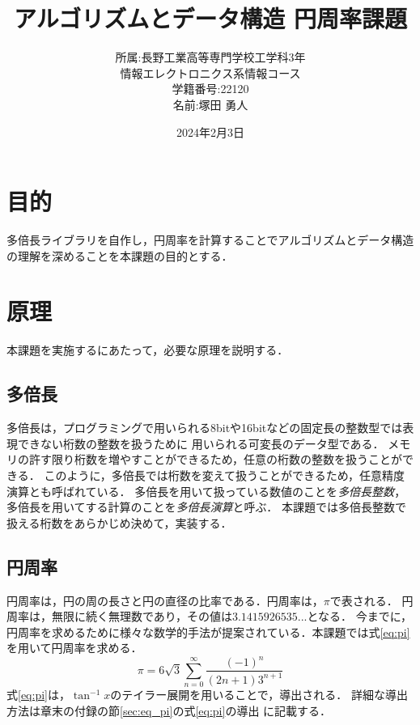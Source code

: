 \documentclass[a4paper,11pt,dvipdfmx]{jsarticle}
\begin{document}
\setcounter{tocdepth}{3} %
\title{アルゴリズムとデータ構造 円周率課題}
\author{所属:長野工業高等専門学校工学科3年\\情報エレクトロニクス系情報コース \\学籍番号:22120 \\名前:塚田 勇人}
\date{2024年2月3日}
\maketitle
\thispagestyle{empty} %
\newpage

\section{目的}
多倍長ライブラリを自作し，円周率を計算することでアルゴリズムとデータ構造の理解を深めることを本課題の目的とする．

\section{原理}
\label{sec:principle}
本課題を実施するにあたって，必要な原理を説明する．

\subsection{多倍長}
多倍長は，プログラミングで用いられる8bitや16bitなどの固定長の整数型では表現できない桁数の整数を扱うために
用いられる可変長のデータ型である．
メモリの許す限り桁数を増やすことができるため，任意の桁数の整数を扱うことができる．
このように，多倍長では桁数を変えて扱うことができるため，任意精度演算とも呼ばれている．
多倍長を用いて扱っている数値のことを\emph{多倍長整数}，多倍長を用いてする計算のことを\emph{多倍長演算}と呼ぶ．
本課題では多倍長整数で扱える桁数をあらかじめ決めて，実装する．

\subsection{円周率}
円周率は，円の周の長さと円の直径の比率である．円周率は，$\pi$で表される．
円周率は，無限に続く無理数であり，その値は$3.1415926535...$となる．
今までに，円周率を求めるために様々な数学的手法が提案されている．本課題では式\eqref{eq:pi}を用いて円周率を求める．
\begin{equation}
  \label{eq:pi}
    \pi = 6\sqrt{3} \sum_{n=0}^{\infty} \frac{(-1)^n}{(2n + 1)3^{n + 1}}
\end{equation}
式\eqref{eq:pi}は，$\tan^{-1} x$のテイラー展開を用いることで，導出される．
詳細な導出方法は章末の付録の節\ref{sec:eq_pi}の式\ref{eq:pi}の導出 に記載する．
\end{document}
